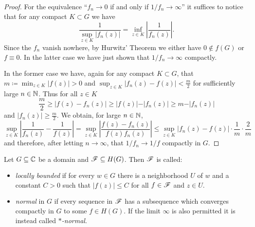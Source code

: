 \begin{proof}
    For the equivalence ``$f_n \to 0$ if and only if $1 / f_n \to \infty$'' it suffices to notice that for any compact $K \subset G$ we have
    \begin{equation*}
        \frac{1}{\sup_{z \in K} \vert f_n(z) \vert} = \inf_{z \in K} \left\vert \frac{1}{f_n(z)} \right\vert.
    \end{equation*}
    Since the $f_n$ vanish nowhere, by Hurwitz' Theorem we either have $0 \notin f(G)$ or $f \equiv 0$. In the latter case we have just shown that $1 / f_n \to \infty$ compactly.

    In the former case we have, again for any compact $K \subset G$, that $m \coloneqq \min_{z \in K} \vert f(z) \vert > 0$ and $\sup_{z \in K} \vert f_n(z) - f(z) \vert < \frac{m}{2}$ for sufficiently large $n \in \mathbb{N}$. Thus for all $z \in K$
    \begin{equation*}
        \frac{m}{2} \geq \vert f(z) - f_n(z) \vert \geq \vert f(z) \vert - \vert f_n(z) \vert \geq  m - \vert f_n(z) \vert
    \end{equation*}
    and $\vert f_n(z) \vert \geq \frac{m}{2}$. We obtain, for large $n \in \mathbb{N}$,
    \begin{equation*}
        \sup_{z \in K} \left\vert \frac{1}{f_n(z)} - \frac{1}{f(z)} \right\vert = \sup_{z \in K} \left\vert \frac{f(z) - f_n(z)}{f(z) f_n(z)} \right\vert \leq \sup_{z \in K} \left\vert f_n(z) - f(z) \right\vert \cdot \frac{1}{m} \cdot \frac{2}{m}
    \end{equation*}
    and therefore, after letting $n \to \infty$, that $1 / f_n \to 1 / f$ compactly in $G$.
\end{proof}

\begin{definition} \label{def:normal-family}
    Let $G \subseteq \mathbb{C}$ be a domain and $\mathscr{F} \subseteq H(G)$. Then $\mathscr{F}$ is called:
    \begin{itemize}
        \item \emph{locally bounded} if for every $w \in G$ there is a neighborhood $U$ of $w$ and a constant $C > 0$ such that $\vert f(z) \vert \leq C$ for all $f \in \mathscr{F}$ and $z \in U$.
        \item \emph{normal} in $G$ if every sequence in $\mathscr{F}$ has a subsequence which converges compactly in $G$ to some $f \in H(G)$. If the limit $\infty$ is also permitted it is instead called \emph{$\ast$-normal}.
    \end{itemize}
\end{definition}

